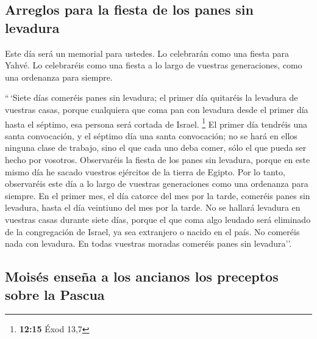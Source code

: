\hypertarget{arreglos-para-la-fiesta-de-los-panes-sin-levadura}{%
\subsection{Arreglos para la fiesta de los panes sin
levadura}\label{arreglos-para-la-fiesta-de-los-panes-sin-levadura}}

 Este día será un memorial para ustedes. Lo celebrarán
como una fiesta para Yahvé. Lo celebraréis como una fiesta a lo largo de
vuestras generaciones, como una ordenanza para siempre.

 ``\,`Siete días comeréis panes sin levadura; el primer
día quitaréis la levadura de vuestras casas, porque cualquiera que coma
pan con levadura desde el primer día hasta el séptimo, esa persona será
cortada de Israel. \footnote{\textbf{12:15} Éxod 13,7} 
El primer día tendréis una santa convocación, y el séptimo día una santa
convocación; no se hará en ellos ninguna clase de trabajo, sino el que
cada uno deba comer, sólo el que pueda ser hecho por vosotros.
 Observaréis la fiesta de los panes sin levadura, porque
en este mismo día he sacado vuestros ejércitos de la tierra de Egipto.
Por lo tanto, observaréis este día a lo largo de vuestras generaciones
como una ordenanza para siempre.  En el primer mes, el
día catorce del mes por la tarde, comeréis panes sin levadura, hasta el
día veintiuno del mes por la tarde.  No se hallará
levadura en vuestras casas durante siete días, porque el que coma algo
leudado será eliminado de la congregación de Israel, ya sea extranjero o
nacido en el país.  No comeréis nada con levadura. En
todas vuestras moradas comeréis panes sin levadura''.

\hypertarget{moisuxe9s-enseuxf1a-a-los-ancianos-los-preceptos-sobre-la-pascua}{%
\subsection{Moisés enseña a los ancianos los preceptos sobre la
Pascua}\label{moisuxe9s-enseuxf1a-a-los-ancianos-los-preceptos-sobre-la-pascua}}

